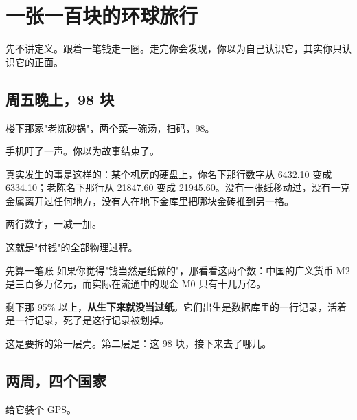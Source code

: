 \chapter{一张一百块的环球旅行}

\begin{ledetext}
先不讲定义。跟着一笔钱走一圈。走完你会发现，你以为自己认识它，其实你只认识它的正面。
\end{ledetext}

\section{周五晚上，98 块}

楼下那家"老陈砂锅"，两个菜一碗汤，扫码，98。

手机叮了一声。你以为故事结束了。

真实发生的事是这样的：某个机房的硬盘上，你名下那行数字从 6432.10 变成 6334.10；老陈名下那行从 21847.60 变成 21945.60。没有一张纸移动过，没有一克金属离开过任何地方，没有人在地下金库里把哪块金砖推到另一格。

两行数字，一减一加。

这就是"付钱"的全部物理过程。

\begin{egbox}{先算一笔账}
如果你觉得"钱当然是纸做的"，那看看这两个数：中国的广义货币 M2 是三百多万亿元，而实际在流通中的现金 M0 只有十几万亿。

剩下那 95\% 以上，\textbf{从生下来就没当过纸}。它们出生是数据库里的一行记录，活着是一行记录，死了是这行记录被划掉。

\end{egbox}

这是要拆的第一层壳。第二层是：这 98 块，接下来去了哪儿。

\section{两周，四个国家}

给它装个 GPS。

